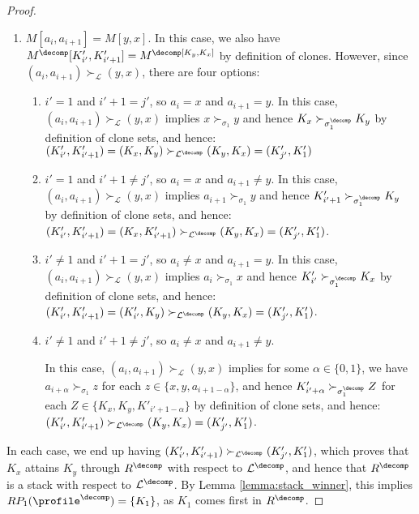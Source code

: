 \begin{proof}
\begin{enumerate}
    \item $M[a_i,a_{i+1}] = M[y,x]$. In this case, we also have $M^\decomp[K'_{i'}, K'_{i'+1}]= M^\decomp[K_y,K_x]$ by definition of clones. However, since $(a_i,a_{i+1})\succ_\mathcal{L}(y,x)$,  there are four options: 
    \begin{enumerate}
        \item $i'=1$ and $i'+1=j'$, so $a_i=x$ and $a_{i+1}=y$. In this case,  $(a_i,a_{i+1})\succ_\mathcal{L}(y,x)$ implies $x \succ _{\sigma_{1}} y$ and hence $K_x \succ_{\sigma^\decomp_1} K_y$ by definition of clone sets, and hence: 
        $(K'_{i'},K'_{i'+1})=(K_{x},K_{y})\succ_{\mathcal{L}^\decomp}(K_y,K_x)=(K'_{j'},K'_1)$
        \item $i'=1$ and $i'+1 \neq j'$, so $a_i=x$ and $a_{i+1} \neq y$. In this case,  $(a_i,a_{i+1})\succ_\mathcal{L}(y,x)$ implies $a_{i+1}\succ_{\sigma_{1}} y$ and hence $K'_{i'+1} \succ_{\sigma^\decomp_1} K_y$ by definition of clone sets, and hence: 
        $(K'_{i'},K'_{i'+1})=(K_{x},K'_{i'+1})\succ_{\mathcal{L}^\decomp}(K_y,K_x)=(K'_{j'},K'_1)$.
        \item $i' \neq 1$ and $i'+1 = j'$, so $a_i \neq x$ and $a_{i+1} = y$. In this case,  $(a_i,a_{i+1})\succ_\mathcal{L}(y,x)$ implies $a_{i}\succ_{\sigma_{1}} x$ and hence $K'_{i'} \succ_{\sigma^\decomp_1} K_x$ by definition of clone sets, and hence: 
        $(K'_{i'},K'_{i'+1})=(K'_{i'},K_{y})\succ_{\mathcal{L}^\decomp}(K_y,K_x)=(K'_{j'},K'_1)$.
        \item $i' \neq 1$ and $i'+1 \neq j'$, so $a_i \neq x$ and $a_{i+1} \neq y$. 
        
        In this case,  $(a_i,a_{i+1})\succ_\mathcal{L}(y,x)$ implies for some $\alpha \in \{0,1\}$, we have $a_{i+\alpha}\succ_{\sigma_{1}} z$ for each $z \in \{x,y,a_{i+1-\alpha}\}$, and hence $K'_{i'+\alpha}\succ_{\sigma_1^\decomp} Z$ for each $Z \in \{K_x,K_y,K'_{i'+1-\alpha}\}$ by definition of clone sets, and hence: 
        $(K'_{i'},K'_{i'+1})\succ_{\mathcal{L}^\decomp}(K_y,K_x)=(K'_{j'},K'_1)$.

    \end{enumerate}
\end{enumerate}
    In each case, we end up having $(K'_{i'},K'_{i'+1})\succ_{\mathcal{L}^\decomp}(K'_{j'},K'_1)$, which proves that $K_x$ attains $K_y$ through $R^\decomp$ with respect to $\mathcal{L}^\decomp$, and hence that $R^{\decomp}$ is a stack with respect to $\mathcal{L}^\decomp$. By Lemma \ref{lemma:stack_winner}, this implies $RP_1(\profile^\decomp)=\{K_1\}$, as $K_1$ comes first in $R^\decomp$. 


\end{proof}
